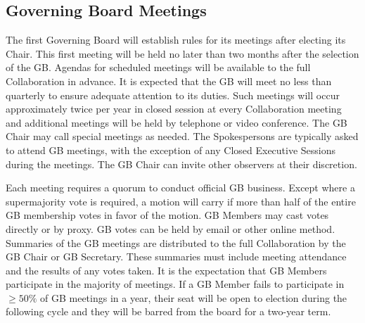 \documentclass[12pt]{article}
\begin{document}
\subsection{Governing Board Meetings}
The first Governing Board will establish rules for its meetings after electing its Chair. This first meeting will be held no later than two months after the selection of the GB.  Agendas for scheduled meetings will be available to the full Collaboration in advance.  It is expected that the GB will meet no less than quarterly to ensure adequate attention to its duties. Such meetings will occur approximately twice per year in closed session at every Collaboration meeting and additional meetings will be held by telephone or video conference. 
The GB Chair may call special meetings as needed. The Spokespersons are typically asked to attend GB meetings, with the exception of any Closed Executive Sessions during the meetings.  The GB Chair can invite other observers at their discretion.

Each meeting requires a quorum to conduct official GB business. Except where a supermajority vote is required, a motion will carry if more than half of the entire GB membership votes in favor of the motion. GB Members may cast votes directly or by proxy. GB votes can be held by email or other online method.
Summaries of the GB meetings are distributed to the full Collaboration by the GB Chair or GB Secretary. These summaries must include meeting attendance and the %
results of any votes taken.
 It is the expectation that GB Members participate in the majority of meetings. If a GB Member fails to participate %
 in $\ge 50\%$ of GB meetings in a year, their seat will be open to election during the following cycle and they will be barred from the board for a two-year term.  
\end{document}
